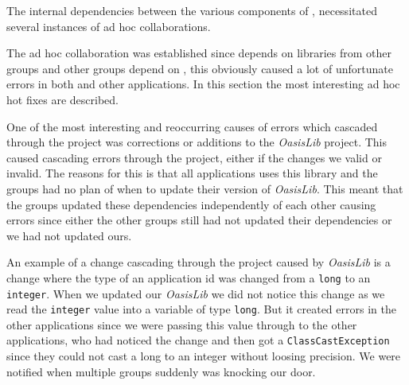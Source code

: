 The internal dependencies between the various components of \giraf, necessitated several instances of ad hoc collaborations.

The ad hoc collaboration was established since \launcher depends on libraries from other groups and other groups depend on \launcher, this obviously caused a lot of unfortunate errors in both \launcher and other applications.
In this section the most interesting ad hoc hot fixes are described.

One of the most interesting and reoccurring causes of errors which cascaded through the \giraf project was corrections or additions to the \textit{OasisLib} project.
This caused cascading errors through the project, either if the changes we valid or invalid.
The reasons for this is that all applications uses this library and the groups had no plan of when to update their version of \textit{OasisLib}.
This meant that the groups updated these dependencies independently of each other causing errors since either the other groups still had not updated their dependencies or we had not updated ours.

An example of a change cascading through the project caused by \textit{OasisLib} is a change where the type of an application id was changed from a \lstinline|long| to an \lstinline|integer|.
When we updated our \textit{OasisLib} we did not notice this change as we read the \lstinline|integer| value into a variable of type \lstinline|long|.
But it created errors in the other applications since we were passing this value through to the other applications, who had noticed the change and then got a \lstinline!ClassCastException! since they could not cast a long to an integer without loosing precision.
We were notified when multiple groups suddenly was knocking our door.





